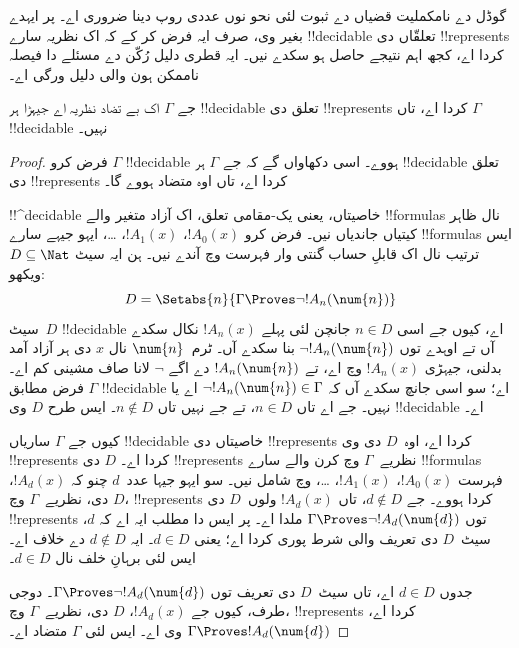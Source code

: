 \documentclass[../../../include/open-logic-section]{subfiles}
\begin{document}


گوڈل دے نامکملیت قضیاں دے ثبوت لئی
نحو نوں عددی روپ دینا ضروری اے۔
پر ایہدے بغیر وی، صرف ایہ فرض کر
کے کہ اک نظریہ سارے !!{decidable}
تعلقّاں دی !!{represents} کردا اے،
کجھ اہم نتیجے حاصل ہو سکدے نیں۔
ایہ قطری دلیل رُکّن دے مسئلے دا
فیصلہ ناممکن ہون والی دلیل ورگی اے۔

\begin{thm}
جے $\Gamma$ اک بے تضاد نظریہ اے
جیہڑا ہر !!{decidable} تعلق دی
!!{represents} کردا اے، تاں
$\Gamma$ !!{decidable} نہیں۔
\end{thm}

\begin{proof}
فرض کرو $\Gamma$ !!{decidable}
ہووے۔ اسی دکھاواں گے کہ جے
$\Gamma$ ہر !!{decidable}
تعلق دی !!{represents} کردا اے،
تاں اوہ متضاد ہووے گا۔

!!^{decidable} خاصیتاں، یعنی
یک-مقامی تعلق، اک آزاد
متغیر والے !!{formula}s نال
ظاہر کیتیاں جاندیاں نیں۔ فرض
کرو $!A_0(x)$، $!A_1(x)$، \dots،
ایہو جیہے سارے !!{formula}s ایس ترتیب نال
اک قابلِ حساب گنتی وار فہرست وچ آندے نیں۔
ہن ایہ سیٹ $D \subseteq \Nat$
ویکھو:
\[
D = \Setabs{n}{\Gamma \Proves \lnot !A_n(\num{n})}
\]
سیٹ~$D$ !!{decidable} اے، کیوں جے
اسی $n \in D$ جانچن لئی پہلے
$!A_n(x)$ نکال سکدے آں تے
اوہدے توں $\lnot !A_n(\num{n})$
بنا سکدے آں۔ ٹرم~$\num{n}$
نال $x$ دی ہر آزاد آمد
بدلنی، جیہڑی $!A_n(x)$ وچ
اے، تے
$!A_n(\num{n})$ دے اگے
$\lnot$ لانا صاف مشینی کم اے۔
فرض مطابق $\Gamma$ !!{decidable}
اے؛ سو اسی جانچ سکدے آں کہ
$\lnot !A_n(\num{n}) \in \Gamma$
اے یا نہیں۔ جے اے تاں
$n \in D$، تے جے نہیں تاں
$n \notin D$۔ ایس طرح
$D$ وی !!{decidable} اے۔

کیوں جے $\Gamma$ ساریاں
!!{decidable} خاصیتاں دی
!!{represents} کردا اے،
اوہ~$D$ دی وی
!!{represents} کردا اے۔
$D$ دی !!{represents} نظریے~$\Gamma$ وچ کرن والے
سارے !!{formula}s
فہرست $!A_0(x)$، $!A_1(x)$،
\dots، وچ شامل نیں۔ سو ایہو جیہا
عدد~$d$ چنو کہ $!A_d(x)$،
$D$ دی، نظریے~$\Gamma$ وچ،
!!{represents}
کردا ہووے۔ جے
$d \notin D$، تاں
$!A_d(x)$ ولوں~$D$
دی !!{represents} توں
$\Gamma \Proves \lnot !A_d(\num{d})$
ملدا اے۔ پر ایس دا مطلب
ایہ اے کہ $d$،
سیٹ~$D$ دی تعریف والی شرط
پوری کردا اے؛ یعنی
$d \in D$۔ ایہ
$d \notin D$ دے خلاف اے۔
ایس لئی برہانِ خلف نال
$d \in D$۔

جدوں $d \in D$ اے، تاں
سیٹ~$D$ دی تعریف توں
$\Gamma \Proves \lnot
!A_d(\num{d})$۔ دوجی
طرف، کیوں جے $!A_d(x)$،
$D$ دی، نظریے~$\Gamma$ وچ،
!!{represents} کردا اے،
$\Gamma \Proves !A_d(\num{d})$
وی اے۔ ایس لئی
$\Gamma$ متضاد اے۔
\end{proof}
\end{document}
